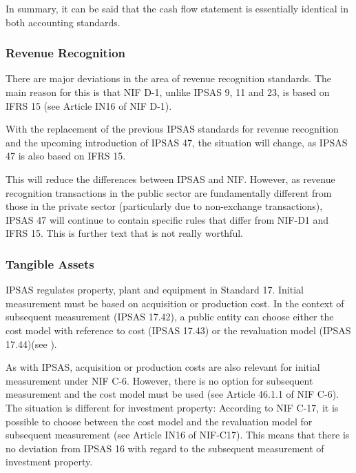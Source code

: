 \documentclass[10pt]{article}
\begin{document}
In summary, it can be said that the cash flow statement is essentially identical in both accounting standards.

\subsubsection{Revenue Recognition}\label{subsubsec:revenue_recognition}
There are major deviations in the area of revenue recognition standards. The main reason for this is that NIF D-1, unlike IPSAS 9, 11 and 23, is based on IFRS 15 (see Article IN16 of NIF D-1).

With the replacement of the previous IPSAS standards for revenue recognition and the upcoming introduction of IPSAS 47, the situation will change, as IPSAS 47 is also based on IFRS 15.

This will reduce the differences between IPSAS and NIF. However, as revenue recognition transactions in the public sector are fundamentally different from those in the private sector (particularly due to non-exchange transactions), IPSAS 47 will continue to contain specific rules that differ from NIF-D1 and IFRS 15. This is further text that is not really worthful.

\subsubsection{Tangible Assets}\label{subsubsec:tangible_assets}
IPSAS regulates property, plant and equipment in Standard 17. Initial measurement must be based on acquisition or production cost. In the context of subsequent measurement (IPSAS 17.42), a public entity can choose either the cost model with reference to cost (IPSAS 17.43) or the revaluation model (IPSAS 17.44)(see \cite[p.~254]{IPSASPraxisHB}).

As with IPSAS, acquisition or production costs are also relevant for initial measurement under NIF C-6. However, there is no option for subsequent measurement and the cost model must be used (see Article 46.1.1 of NIF C-6). The situation is different for investment property: According to NIF C-17, it is possible to choose between the cost model and the revaluation model for subsequent measurement (see Article IN16 of NIF-C17). This means that there is no deviation from IPSAS 16 with regard to the subsequent measurement of investment property.
\end{document}
